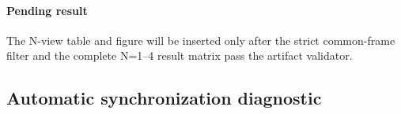 \documentclass[preprint,12pt]{elsarticle}
\providecommand{\DIFaddend}{} %
\providecommand{\DIFdelbegin}{} %
\begin{document}
{\paragraph{Pending result} The N-view table and figure will be inserted only after the strict common-frame filter and the complete N=1--4 result matrix pass the artifact validator.
}
\DIFaddend 

\FloatBarrier
\subsection{Automatic synchronization diagnostic}

\DIFdelbegin %
\end{document}
